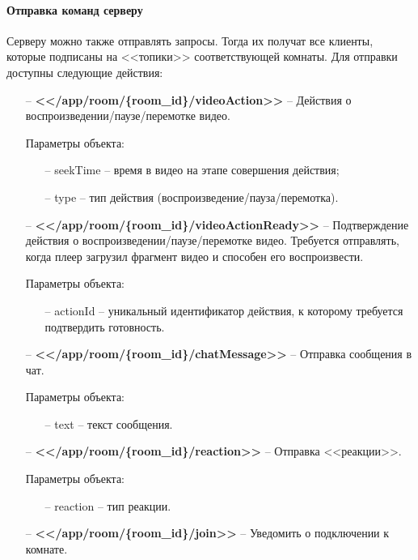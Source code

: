 \documentclass{../includes/TechDoc}
\begin{document}
    \paragraph{Отправка команд серверу}
    Серверу можно также отправлять запросы. Тогда их получат все клиенты, которые подписаны на <<топики>> соответствующей комнаты. Для отправки доступны следующие действия:
    \begin{itemize}
    	\item[--] \textbf{<</app/room/\{room\_id\}/videoAction>>} -- Действия о воспроизведении/паузе/перемотке видео.

    	Параметры объекта:
    	\begin{itemize}[noitemsep]
    		\item[--] seekTime -- время в видео на этапе совершения действия;
    		\item[--] type -- тип действия (воспроизведение/пауза/перемотка).
    	\end{itemize}
    	\item[--] \textbf{<</app/room/\{room\_id\}/videoActionReady>>} -- Подтверждение действия о воспроизведении/паузе/перемотке видео. Требуется отправлять, когда плеер загрузил фрагмент видео и способен его воспроизвести.

    	Параметры объекта:
    	\begin{itemize}[noitemsep]
    		\item[--] actionId -- уникальный идентификатор действия, к которому требуется подтвердить готовность.
    	\end{itemize}
    	\item[--] \textbf{<</app/room/\{room\_id\}/chatMessage>>} -- Отправка сообщения в чат.

    	Параметры объекта:
    	\begin{itemize}[noitemsep]
    		\item[--] text -- текст сообщения.
    	\end{itemize}
    	\item[--] \textbf{<</app/room/\{room\_id\}/reaction>>} -- Отправка <<реакции>>.

    	Параметры объекта:
    	\begin{itemize}[noitemsep]
    		\item[--] reaction -- тип реакции.
    	\end{itemize}
    	\item[--] \textbf{<</app/room/\{room\_id\}/join>>} -- Уведомить о подключении к комнате.
    \end{itemize}
\end{document}
